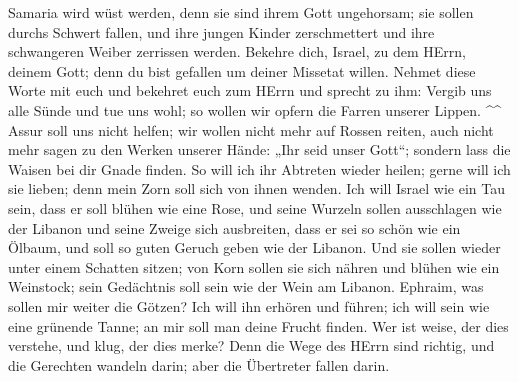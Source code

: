  Samaria wird wüst werden, denn sie sind ihrem Gott
ungehorsam; sie sollen durchs Schwert fallen, und ihre jungen Kinder
zerschmettert und ihre schwangeren Weiber zerrissen werden.
 Bekehre dich, Israel, zu dem HErrn, deinem Gott; denn du
bist gefallen um deiner Missetat willen.  Nehmet diese
Worte mit euch und bekehret euch zum HErrn und sprecht zu ihm: Vergib
uns alle Sünde und tue uns wohl; so wollen wir opfern die Farren unserer
Lippen. \^{}\^{}  Assur soll uns nicht helfen; wir wollen
nicht mehr auf Rossen reiten, auch nicht mehr sagen zu den Werken
unserer Hände: „Ihr seid unser Gott``; sondern lass die Waisen bei dir
Gnade finden.  So will ich ihr Abtreten wieder heilen;
gerne will ich sie lieben; denn mein Zorn soll sich von ihnen wenden.
 Ich will Israel wie ein Tau sein, dass er soll blühen wie
eine Rose, und seine Wurzeln sollen ausschlagen wie der Libanon
 und seine Zweige sich ausbreiten, dass er sei so schön
wie ein Ölbaum, und soll so guten Geruch geben wie der Libanon.
 Und sie sollen wieder unter einem Schatten sitzen; von
Korn sollen sie sich nähren und blühen wie ein Weinstock; sein
Gedächtnis soll sein wie der Wein am Libanon.  Ephraim,
was sollen mir weiter die Götzen? Ich will ihn erhören und führen; ich
will sein wie eine grünende Tanne; an mir soll man deine Frucht finden.
 Wer ist weise, der dies verstehe, und klug, der dies
merke? Denn die Wege des HErrn sind richtig, und die Gerechten wandeln
darin; aber die Übertreter fallen darin.
